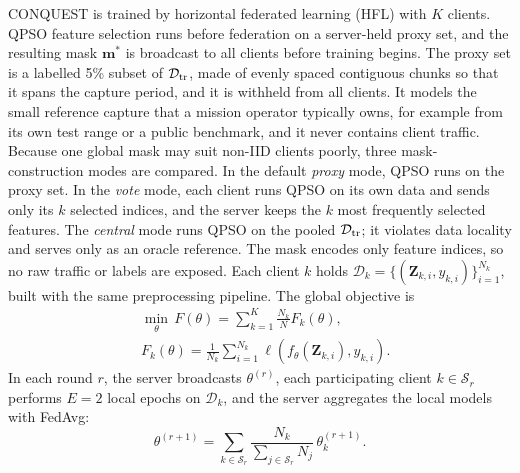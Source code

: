 \documentclass[conference]{IEEEtran}
\begin{document}
CONQUEST is trained by horizontal federated learning (HFL) with $K$
clients. QPSO feature selection runs before federation on a
server-held proxy set, and the resulting mask $\mathbf{m}^{*}$ is
broadcast to all clients before training begins.
The proxy set is a labelled 5\% subset of
$\mathcal{D}_{\rm tr}$, made of evenly spaced contiguous chunks so
that it spans the capture period, and it is withheld from all
clients. It models the small reference capture that a mission
operator typically owns, for example from its own test range or a
public benchmark, and it never contains client traffic. Because one
global mask may suit non-IID clients poorly, three mask-construction
modes are compared. In the default \textit{proxy} mode, QPSO runs on
the proxy set. In the \textit{vote} mode, each client runs QPSO on its
own data and sends only its $k$ selected indices, and the server
keeps the $k$ most frequently selected features. The
\textit{central} mode runs QPSO on the pooled $\mathcal{D}_{\rm tr}$;
it violates data locality and serves only as an oracle reference.
The mask encodes only feature indices, so no raw traffic or labels
are exposed. Each client $k$ holds
$\mathcal{D}_k=\{(\mathbf{Z}_{k,i},y_{k,i})\}_{i=1}^{N_k}$, built with
the same preprocessing pipeline. The global objective is
\begin{equation}
\begin{aligned}
&\min_{\theta}\,F(\theta)=\sum_{k=1}^{K}\frac{N_k}{N}F_k(\theta),\\
&F_k(\theta)=\frac{1}{N_k}\sum_{i=1}^{N_k}
\ell\!\left(f_\theta(\mathbf{Z}_{k,i}),y_{k,i}\right).
\end{aligned}
\label{eq:hfl_objective}
\end{equation}
In each round $r$, the server broadcasts $\theta^{(r)}$, each
participating client $k\in\mathcal{S}_r$ performs $E=2$ local epochs
on $\mathcal{D}_k$, and the server aggregates the local models with
FedAvg:
\begin{equation}
\theta^{(r+1)}=\sum_{k\in\mathcal{S}_r}
\frac{N_k}{\sum_{j\in\mathcal{S}_r}N_j}
\,\theta_k^{(r+1)}.
\label{eq:fedavg}
\end{equation}
\end{document}
